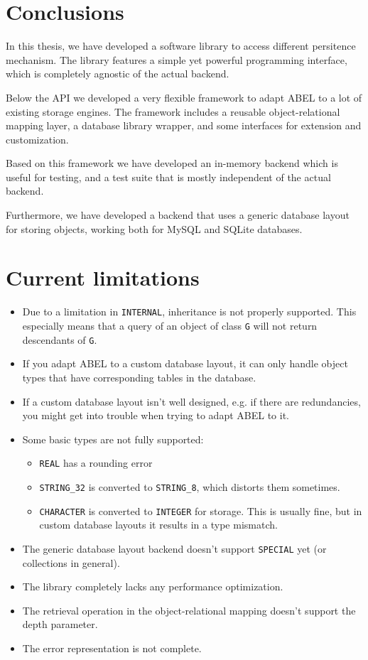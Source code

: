 \section{Conclusions}

In this thesis, we have developed a software library to access different persitence mechanism.
The library features a simple yet powerful programming interface, which is completely agnostic of the actual backend.

Below the API we developed a very flexible framework to adapt ABEL to a lot of existing storage engines.
The framework includes a reusable object-relational mapping layer, a database library wrapper, and some interfaces for extension and customization.

Based on this framework we have developed an in-memory backend which is useful for testing, and a test suite that is mostly independent of the actual backend.

Furthermore, we have developed a backend that uses a generic database layout for storing objects, working both for MySQL and SQLite databases.

\section{Current limitations}

\begin{itemize}
\item Due to a limitation in \lstinline!INTERNAL!, inheritance is not properly supported.
This especially means that a query of an object of class \lstinline!G! will not return descendants of \lstinline!G!.
\item If you adapt ABEL to a custom database layout, it can only handle object types that have corresponding tables in the database.
\item If a custom database layout isn't well designed, e.g. if there are redundancies, you might get into trouble when trying to adapt ABEL to it.
\item Some basic types are not fully supported:
\begin{itemize}
	\item \lstinline!REAL! has a rounding error
	\item \lstinline!STRING_32! is converted to \lstinline!STRING_8!, which distorts them sometimes.
	\item \lstinline!CHARACTER! is converted to \lstinline!INTEGER! for storage.
	This is usually fine, but in custom database layouts it results in a type mismatch.
\end{itemize}
\item The generic database layout backend doesn't support \lstinline!SPECIAL! yet (or collections in general).
\item The library completely lacks any performance optimization.
\item The retrieval operation in the object-relational mapping doesn't support the depth parameter.
\item The error representation is not complete.
\end{itemize}

